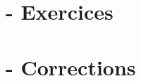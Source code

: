 

\newpage

\section*{\titre - Exercices}







\setcounter{exrcntr}{0}

\newpage

\section*{\titre - Corrections}








